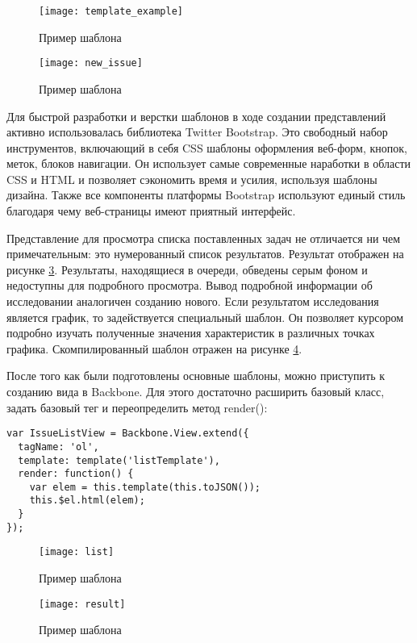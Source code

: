 \begin{figure}[ht]
\center\texttt{[image: template\_example]}
\caption{Пример шаблона}\label{template_example}
\end{figure}

\begin{figure}[ht]
\center\texttt{[image: new\_issue]}
\caption{Пример шаблона}\label{new_issue}
\end{figure}

Для быстрой разработки и верстки шаблонов в ходе создании представлений активно использовалась библиотека Twitter Bootstrap. Это свободный набор инструментов, включающий в себя CSS шаблоны оформления веб-форм, кнопок, меток, блоков навигации. Он использует самые современные наработки в области CSS и HTML и позволяет сэкономить время и усилия, используя шаблоны дизайна. Также все компоненты платформы Bootstrap используют единый стиль благодаря чему веб-страницы имеют приятный интерфейс.

Представление для просмотра списка поставленных задач не отличается ни чем примечательным: это нумерованный список результатов. Результат отображен на рисунке \ref{list}. Результаты, находящиеся в очереди, обведены серым фоном и недоступны для подробного просмотра. Вывод подробной информации об исследовании аналогичен созданию нового. Если результатом исследования является график, то задействуется специальный шаблон. Он позволяет курсором подробно изучать полученные значения характеристик в различных точках графика. Скомпилированный шаблон отражен на рисунке \ref{result}.

\lstset{ %
  language=JavaScript
}

После того как были подготовлены основные шаблоны, можно приступить к созданию вида в Backbone. Для этого достаточно расширить базовый класс, задать базовый тег и переопределить метод render():
\begin{lstlisting}
var IssueListView = Backbone.View.extend({
  tagName: 'ol',
  template: template('listTemplate'),
  render: function() {
    var elem = this.template(this.toJSON());
    this.$el.html(elem);
  }
});
\end{lstlisting}

\begin{figure}[ht]
\center\texttt{[image: list]}
\caption{Пример шаблона}\label{list}
\end{figure}

\begin{figure}[ht]
\center\texttt{[image: result]}
\caption{Пример шаблона}\label{result}
\end{figure}

